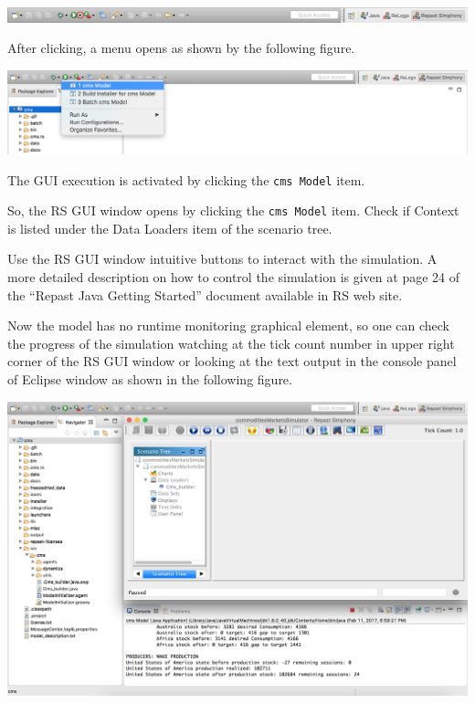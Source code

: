 \documentclass{article}
\begin{document}
\vskip2mm
\noindent
\includegraphics[scale=0.35]{fig_cms_rs_execution1}

After clicking, a menu opens as shown by the following figure. 

\vskip2mm
\noindent
\includegraphics[scale=0.35]{fig_cms_rs_execution2}

\vskip2mm
The GUI execution is activated by clicking the \verb+cms Model+ item.


So, the RS GUI window opens by clicking the \verb+cms Model+ item. Check if Context is listed under the Data Loaders item of the scenario tree.

Use the RS GUI window intuitive buttons to interact with the simulation. A more detailed description on how to control the simulation is given at page 24 of the ``Repast Java Getting Started'' document available in RS web site.

Now the model has no runtime monitoring graphical element, so one can check the progress of the simulation watching at the tick count number in upper right corner of the RS GUI window or looking at the text output in the console panel of Eclipse window as shown in the following figure. 

\vskip2mm
\noindent
\includegraphics[scale=0.35]{fig_cms_rs_gui7}
\end{document}
